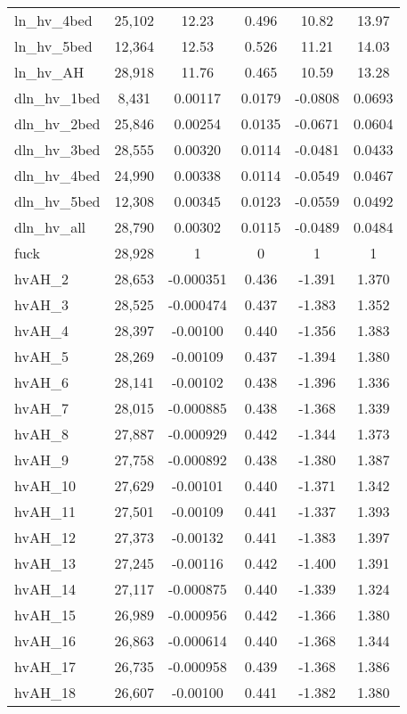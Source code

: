 \begin{tabular}{lccccc}
ln\_hv\_4bed & 25,102 & 12.23 & 0.496 & 10.82 & 13.97 \\
ln\_hv\_5bed & 12,364 & 12.53 & 0.526 & 11.21 & 14.03 \\
ln\_hv\_AH & 28,918 & 11.76 & 0.465 & 10.59 & 13.28 \\
dln\_hv\_1bed & 8,431 & 0.00117 & 0.0179 & -0.0808 & 0.0693 \\
dln\_hv\_2bed & 25,846 & 0.00254 & 0.0135 & -0.0671 & 0.0604 \\
dln\_hv\_3bed & 28,555 & 0.00320 & 0.0114 & -0.0481 & 0.0433 \\
dln\_hv\_4bed & 24,990 & 0.00338 & 0.0114 & -0.0549 & 0.0467 \\
dln\_hv\_5bed & 12,308 & 0.00345 & 0.0123 & -0.0559 & 0.0492 \\
dln\_hv\_all & 28,790 & 0.00302 & 0.0115 & -0.0489 & 0.0484 \\
fuck & 28,928 & 1 & 0 & 1 & 1 \\
hvAH\_2 & 28,653 & -0.000351 & 0.436 & -1.391 & 1.370 \\
hvAH\_3 & 28,525 & -0.000474 & 0.437 & -1.383 & 1.352 \\
hvAH\_4 & 28,397 & -0.00100 & 0.440 & -1.356 & 1.383 \\
hvAH\_5 & 28,269 & -0.00109 & 0.437 & -1.394 & 1.380 \\
hvAH\_6 & 28,141 & -0.00102 & 0.438 & -1.396 & 1.336 \\
hvAH\_7 & 28,015 & -0.000885 & 0.438 & -1.368 & 1.339 \\
hvAH\_8 & 27,887 & -0.000929 & 0.442 & -1.344 & 1.373 \\
hvAH\_9 & 27,758 & -0.000892 & 0.438 & -1.380 & 1.387 \\
hvAH\_10 & 27,629 & -0.00101 & 0.440 & -1.371 & 1.342 \\
hvAH\_11 & 27,501 & -0.00109 & 0.441 & -1.337 & 1.393 \\
hvAH\_12 & 27,373 & -0.00132 & 0.441 & -1.383 & 1.397 \\
hvAH\_13 & 27,245 & -0.00116 & 0.442 & -1.400 & 1.391 \\
hvAH\_14 & 27,117 & -0.000875 & 0.440 & -1.339 & 1.324 \\
hvAH\_15 & 26,989 & -0.000956 & 0.442 & -1.366 & 1.380 \\
hvAH\_16 & 26,863 & -0.000614 & 0.440 & -1.368 & 1.344 \\
hvAH\_17 & 26,735 & -0.000958 & 0.439 & -1.368 & 1.386 \\
hvAH\_18 & 26,607 & -0.00100 & 0.441 & -1.382 & 1.380 \\

\end{tabular}
